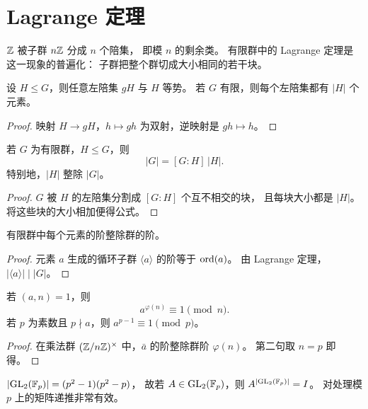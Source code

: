 \section{Lagrange 定理}
\begin{example}[先从整数的余类看]
$\mathbb{Z}$ 被子群 $n\mathbb{Z}$ 分成 $n$ 个陪集，
即模 $n$ 的剩余类。
有限群中的 Lagrange 定理是这一现象的普遍化：
子群把整个群切成大小相同的若干块。
\end{example}
\begin{proposition}
设 $H\le G$，则任意左陪集 $gH$ 与 $H$ 等势。
若 $G$ 有限，则每个左陪集都有 $|H|$ 个元素。
\end{proposition}
\begin{proof}
映射 $H\to gH$，$h\mapsto gh$ 为双射，逆映射是 $gh\mapsto h$。
\end{proof}
\begin{theorem}[Lagrange]
若 $G$ 为有限群，$H\le G$，则
\[
|G|=[G:H]\,|H|.
\]
特别地，$|H|$ 整除 $|G|$。
\end{theorem}
\begin{proof}
$G$ 被 $H$ 的左陪集分割成 $[G:H]$ 个互不相交的块，
且每块大小都是 $|H|$。
将这些块的大小相加便得公式。
\end{proof}
\begin{corollary}
有限群中每个元素的阶整除群的阶。
\end{corollary}
\begin{proof}
元素 $a$ 生成的循环子群 $\langle a\rangle$ 的阶等于 $\mathrm{ord}(a)$。
由 Lagrange 定理，$|\langle a\rangle|\mid |G|$。
\end{proof}
\begin{corollary}
若 $(a,n)=1$，则
\[
 a^{\varphi(n)}\equiv 1\pmod n.
\]
若 $p$ 为素数且 $p\nmid a$，则 $a^{p-1}\equiv1\pmod p$。
\end{corollary}
\begin{proof}
在乘法群 $(\mathbb{Z}/n\mathbb{Z})^\times$ 中，$\bar a$ 的阶整除群阶 $\varphi(n)$。
第二句取 $n=p$ 即得。
\end{proof}
\begin{example}
$|\mathrm{GL}_2(\mathbb{F}_p)|=(p^2-1)(p^2-p)$，
故若 $A\in\mathrm{GL}_2(\mathbb{F}_p)$，则 $A^{|\mathrm{GL}_2(\mathbb{F}_p)|}=I$。
对处理模 $p$ 上的矩阵递推非常有效。
\end{example}
